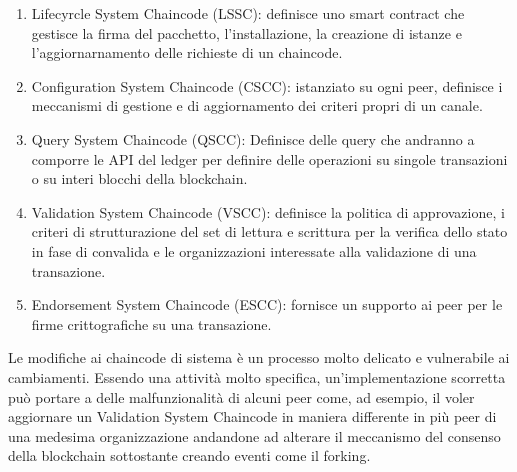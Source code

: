 \begin{enumerate}
    \item Lifecyrcle  System Chaincode (LSSC): definisce uno smart contract che gestisce la firma del pacchetto, l'installazione, la creazione di istanze e l'aggiornarnamento delle richieste di un chaincode. 
    \item Configuration System Chaincode (CSCC): istanziato su ogni peer, definisce i meccanismi di gestione e di aggiornamento dei criteri propri di un canale. 
    \item Query System Chaincode (QSCC): Definisce delle query che andranno a comporre le API del ledger per definire delle operazioni su singole transazioni o su interi blocchi della blockchain.
    \item Validation System Chaincode (VSCC): definisce la politica di approvazione, i criteri di strutturazione del set di lettura e scrittura per la verifica dello stato in fase di convalida e le organizzazioni interessate alla validazione di una transazione. 
    \item Endorsement System Chaincode (ESCC): fornisce un supporto ai peer per le firme crittografiche su una transazione.  
\end{enumerate}
Le modifiche ai chaincode di sistema è un processo molto delicato e vulnerabile ai cambiamenti. Essendo una attività molto specifica, un'implementazione scorretta può portare a delle malfunzionalità di alcuni peer come, ad esempio, il voler aggiornare un Validation System Chaincode in maniera differente in più peer di una medesima organizzazione andandone ad alterare il meccanismo del consenso della blockchain sottostante creando eventi come il forking.
